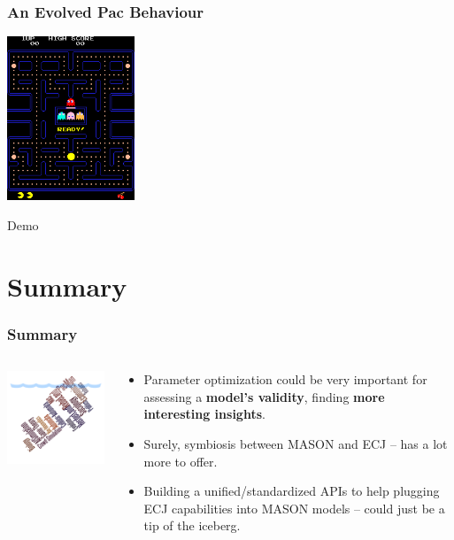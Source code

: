 \documentclass{beamer}
\begin{document}
\begin{frame}
	\frametitle{An Evolved Pac Behaviour}
	\begin{block}{}
		\centering
		\includegraphics[width=1.5in,keepaspectratio]{pac-man.png}
	\end{block}
	\vspace{-25pt}
	\begin{block}{}
		\Huge{\centerline{Demo}}
	\end{block}
\end{frame}

\section{Summary}
\begin{frame}
	\frametitle{Summary}
	\begin{columns}[c]
		\column{2.5in}
			\centering
			\includegraphics[width=2.5in,keepaspectratio]{iceberg.pdf}
		\column{2in}
		\begin{footnotesize}
			\begin{itemize}
				\setlength{\itemsep}{0.30cm}
				\item Parameter optimization could be very important for assessing a \textbf{model's validity}, finding \textbf{more interesting insights}.
				\item Surely, symbiosis between MASON and ECJ -- has a lot more to offer.
				\item Building a unified/standardized APIs to help plugging ECJ capabilities into MASON models -- could just be a tip of the iceberg.
			\end{itemize}
		\end{footnotesize}
	\end{columns}
\end{frame} 
\end{document}
